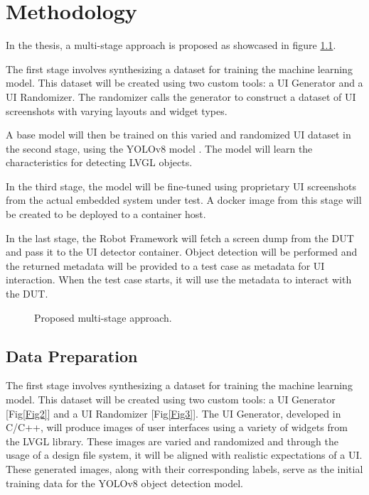 \documentclass[Proposal,BIC,english,IEEE]{BASE/twbook} %
\begin{document}
\chapter{Methodology}
In the thesis, a multi-stage approach is proposed as showcased in figure \ref{Fig1}.

The first stage involves synthesizing a dataset for training the machine learning model. This dataset will be created using two custom tools: a UI Generator and a UI Randomizer. The randomizer calls the generator to construct a dataset of UI screenshots with varying layouts and widget types.

A base model will then be trained on this varied and randomized UI dataset in the second stage, using the YOLOv8 model \autocite{jocherUltralyticsYOLO2023}. The model will learn the characteristics for detecting LVGL objects.

In the third stage, the model will be fine-tuned using proprietary UI screenshots from the actual embedded system under test. A docker image from this stage will be created to be deployed to a container host.

In the last stage, the Robot Framework \autocite{RobotFramework} will fetch a screen dump from the DUT and pass it to the UI detector container. Object detection will be performed and the returned metadata will be provided to a test case as metadata for UI interaction. When the test case starts, it will use the metadata to interact with the DUT.
\begin{figure}[!htbp]
    \centering
    
    \caption{Proposed multi-stage approach.}\label{Fig1}
\end{figure}
\newpage
\section{Data Preparation}
The first stage involves synthesizing a dataset for training the machine learning model. This dataset will be created using two custom tools: a UI Generator [Fig\ref{Fig2}] and a UI Randomizer [Fig\ref{Fig3}]. The UI Generator, developed in C/C++, will produce images of user interfaces using a variety of widgets from the LVGL library. These images are varied and randomized and through the usage of a design file system, it will be aligned with realistic expectations of a UI. These generated images, along with their corresponding labels, serve as the initial training data for the YOLOv8 object detection model.
\end{document}
